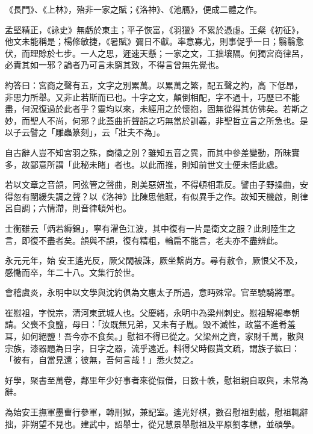 \begin{pinyinscope}
 《長門》、《上林》，殆非一家之賦；《洛神》、《池鴈》，便成二體之作。



 孟堅精正，《詠史》無虧於東主；平子恢富，《羽獵》不累於憑虛。王粲《初征》，他文未能稱是；楊修敏捷，《暑賦》彌日不獻。率意寡尤，則事促乎一日；翳翳愈伏，而理賒於七步。一人之思，遲速天懸；一家之文，工拙壤隔。何獨宮商律呂，必責其如一邪？論者乃可言未窮其致，不得言曾無先覺也。



 約答曰：宮商之聲有五，文字之別累萬。以累萬之繁，配五聲之約，高
 下低昂，非思力所舉。又非止若斯而已也。十字之文，顛倒相配，字不過十，巧歷已不能盡，何況復過於此者乎？靈均以來，未經用之於懷抱，固無從得其仿佛矣。若斯之妙，而聖人不尚，何邪？此蓋曲折聲韻之巧無當於訓義，非聖哲立言之所急也。是以子云譬之「雕蟲篆刻」，云「壯夫不為」。



 自古辭人豈不知宮羽之殊，商徵之別？雖知五音之異，而其中參差變動，所昧實多，故鄙意所謂「此秘未睹」者也。以此而推，則知前世文士便未悟此處。



 若以文章之音韻，同弦管之聲曲，則美惡妍蚩，不得頓相乖反。譬由子野操曲，安得忽有闡緩失調之聲？以《洛神》比陳思他賦，有似異手之作。故知天機啟，則律呂自調；六情滯，則音律頓舛也。



 士衡雖云「炳若縟錦」，寧有濯色江波，其中復有一片是衛文之服？此則陸生之言，即復不盡者矣。韻與不韻，復有精粗，輪扁不能言，老夫亦不盡辨此。



 永元元年，始
 安王遙光反，厥父閑被誅，厥坐繫尚方。尋有赦令，厥恨父不及，感慟而卒，年二十八。文集行於世。



 會稽虞炎，永明中以文學與沈約俱為文惠太子所遇，意眄殊常。官至驍騎將軍。



 崔慰祖，字悅宗，清河東武城人也。父慶緒，永明中為梁州刺史。慰祖解褐奉朝請。父喪不食鹽，母曰：「汝既無兄弟，又未有子胤。毀不滅性，政當不進肴羞耳，如何絕鹽！吾今亦不食矣。」慰祖不得已從之。父梁州之資，家財千萬，散與宗族，漆器題為日字，日字之器，流乎遠近。料得父時假貰文疏，謂族子紘曰：「彼有，自當見還；彼無，吾何言哉！」悉火焚之。



 好學，聚書至萬卷，鄰里年少好事者來從假借，日數十帙，慰祖親自取與，未常為辭。



 為始安王撫軍墨曹行參軍，轉刑獄，兼記室。遙光好棋，數召慰祖對戲，慰祖輒辭拙，非朔望不見也。建武中，詔舉士，從兄慧景舉慰祖及平原劉孝標，並碩學。




\end{pinyinscope}
